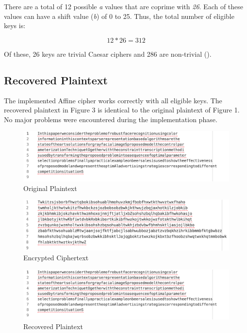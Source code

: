 \documentclass[]{article}
\begin{document}
\noindent
There are a total of 12 possible \textit{a} values that are coprime with \textit{26}. Each of these values can have a shift value (\textit{b}) of 0 to 25. Thus, the total number of eligible keys is:

$$12*26=312$$

\noindent
Of these, 26 keys are trivial Caesar ciphers and 286 are non-trivial (\cite{maintext}).
\newpage
\subsection*{Recovered Plaintext}

The implemented Affine cipher works correctly with all eligible keys. The recovered plaintext in Figure 3 is identical to the original plaintext of Figure 1. No major problems were encountered during the implementation phase.
\vspace{1cm}
\begin{figure}[H]
	\includegraphics[width=\textwidth]{affine_plaintext.png}
	\caption{Original Plaintext}
	\centering
\end{figure}

\begin{figure}[H]
	\includegraphics[width=\textwidth]{affine_ciphertext.png}
	\caption{Encrypted Ciphertext}
	\centering
\end{figure}

\begin{figure}[H]
	\includegraphics[width=\textwidth]{affine_plaintext.png}
	\caption{Recovered Plaintext}
	\centering
\end{figure}
\end{document}
